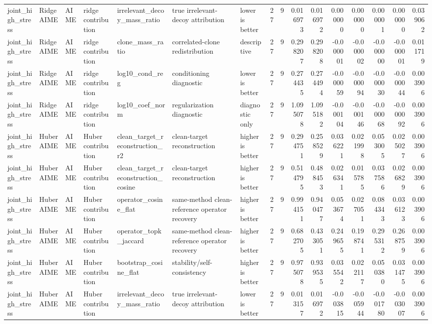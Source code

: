 \begin{table}[t]
\begin{tabular}{lllllllrrrrrrrrr}
joint_high_stress & RidgeAIME & AIME & ridge contribution & irrelevant_decoy_mass_ratio & true irrelevant-decoy attribution & lower is better & 27 & 9 & 0.016973 & 0.016972 & 0.000000 & 0.000000 & 0.000001 & 0.000000 & 0.039062 \\
joint_high_stress & RidgeAIME & AIME & ridge contribution & clone_mass_ratio & correlated-clone redistribution & descriptive & 27 & 9 & 0.298207 & 0.298208 & -0.000001 & -0.000002 & -0.000000 & -0.000001 & 0.011719 \\
joint_high_stress & RidgeAIME & AIME & ridge contribution & log10_cond_reg & conditioning diagnostic & lower is better & 27 & 9 & 0.274435 & 0.274494 & -0.000059 & -0.000094 & -0.000030 & -0.000044 & 0.003906 \\
joint_high_stress & RidgeAIME & AIME & ridge contribution & log10_coef_norm & regularization diagnostic & diagnostic only & 27 & 9 & 1.095078 & 1.095182 & -0.000104 & -0.000146 & -0.000068 & -0.000092 & 0.003906 \\
joint_high_stress & HuberAIME & AIME & Huber contribution & clean_target_reconstruction_r2 & clean-target reconstruction & higher is better & 27 & 9 & 0.294751 & 0.258529 & 0.036221 & 0.021998 & 0.053005 & 0.025027 & 0.003906 \\
joint_high_stress & HuberAIME & AIME & Huber contribution & clean_target_reconstruction_cosine & clean-target reconstruction & higher is better & 27 & 9 & 0.514795 & 0.488453 & 0.026341 & 0.015785 & 0.037586 & 0.026829 & 0.003906 \\
joint_high_stress & HuberAIME & AIME & Huber contribution & operator_cosine_flat & same-method clean-reference operator recovery & higher is better & 27 & 9 & 0.994151 & 0.940477 & 0.053674 & 0.027051 & 0.084343 & 0.036123 & 0.003906 \\
joint_high_stress & HuberAIME & AIME & Huber contribution & operator_topk_jaccard & same-method clean-reference operator recovery & higher is better & 27 & 9 & 0.682705 & 0.433051 & 0.249655 & 0.198741 & 0.295312 & 0.268759 & 0.003906 \\
joint_high_stress & HuberAIME & AIME & Huber contribution & bootstrap_cosine_flat & stability/self-consistency & higher is better & 27 & 9 & 0.975078 & 0.939535 & 0.035542 & 0.022117 & 0.050380 & 0.031475 & 0.003906 \\
joint_high_stress & HuberAIME & AIME & Huber contribution & irrelevant_decoy_mass_ratio & true irrelevant-decoy attribution & lower is better & 27 & 9 & 0.013157 & 0.016972 & -0.003815 & -0.005944 & -0.001780 & -0.003007 & 0.003906 \\

\end{tabular}
\end{table}
